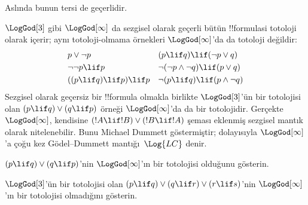 Aslında bunun tersi de geçerlidir.

$\LogGod[3]$ gibi $\LogGod[\infty]$ da sezgisel olarak geçerli bütün
!!{formula}s{}i totoloji olarak içerir; aynı totoloji-olmama örnekleri
$\LogGod[\infty]$'da da totoloji değildir:
\begin{align*}
  & p \lor \lnot p && (p \lif q) \lif (\lnot p \lor q) \\
  & \lnot\lnot p \lif p && \lnot(\lnot p \land \lnot q) \lif (p \lor q) \\
  & ((p \lif q) \lif p) \lif p && \lnot(p \lif q) \lif (p \land \lnot q)
\end{align*}
Sezgisel olarak geçersiz bir !!{formula} olmakla birlikte $\LogGod[3]$'ün
bir totolojisi olan $(p \lif q) \lor (q \lif p)$ örneği
$\LogGod[\infty]$'da da bir totolojidir. Gerçekte $\LogGod[\infty]$,
kendisine
$(!A \lif !B) \lor (!B \lif !A)$ şeması eklenmiş sezgisel mantık olarak
nitelenebilir. Bunu Michael Dummett göstermiştir; dolayısıyla
$\LogGod[\infty]$'a çoğu kez G\"odel--Dummett mantığı~$\Log{LC}$ denir.

\begin{prob}
  $(p \lif q) \lor (q \lif p)$'nin $\LogGod[\infty]$'ın bir totolojisi
  olduğunu gösterin.
\end{prob}

\begin{prob}
  $\LogGod[3]$'ün bir totolojisi olan
  $(p \lif q) \lor (q \lif r) \lor (r \lif s)$'nin
  $\LogGod[\infty]$'ın bir totolojisi olmadığını gösterin.
\end{prob}

